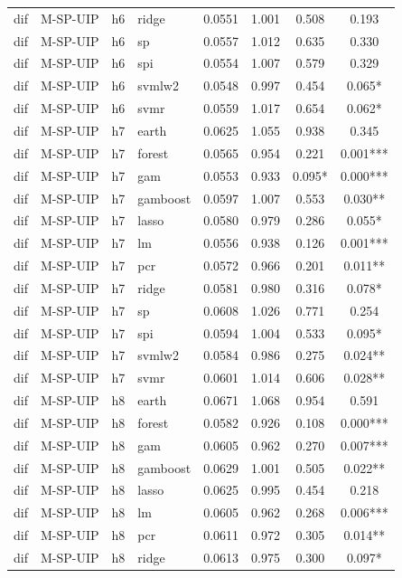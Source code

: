 \begin{ThreePartTable}
\begin{longtable}[t]{llclcccc}
dif & M-SP-UIP & h6 & ridge & 0.0551 & 1.001 & 0.508 & 0.193\\
dif & M-SP-UIP & h6 & sp & 0.0557 & 1.012 & 0.635 & 0.330\\
dif & M-SP-UIP & h6 & spi & 0.0554 & 1.007 & 0.579 & 0.329\\
dif & M-SP-UIP & h6 & svmlw2 & 0.0548 & 0.997 & 0.454 & 0.065*\\
dif & M-SP-UIP & h6 & svmr & 0.0559 & 1.017 & 0.654 & 0.062*\\
\addlinespace
dif & M-SP-UIP & h7 & earth & 0.0625 & 1.055 & 0.938 & 0.345\\
dif & M-SP-UIP & h7 & forest & 0.0565 & 0.954 & 0.221 & 0.001***\\
dif & M-SP-UIP & h7 & gam & 0.0553 & 0.933 & 0.095* & 0.000***\\
dif & M-SP-UIP & h7 & gamboost & 0.0597 & 1.007 & 0.553 & 0.030**\\
dif & M-SP-UIP & h7 & lasso & 0.0580 & 0.979 & 0.286 & 0.055*\\
dif & M-SP-UIP & h7 & lm & 0.0556 & 0.938 & 0.126 & 0.001***\\
dif & M-SP-UIP & h7 & pcr & 0.0572 & 0.966 & 0.201 & 0.011**\\
dif & M-SP-UIP & h7 & ridge & 0.0581 & 0.980 & 0.316 & 0.078*\\
dif & M-SP-UIP & h7 & sp & 0.0608 & 1.026 & 0.771 & 0.254\\
dif & M-SP-UIP & h7 & spi & 0.0594 & 1.004 & 0.533 & 0.095*\\
dif & M-SP-UIP & h7 & svmlw2 & 0.0584 & 0.986 & 0.275 & 0.024**\\
dif & M-SP-UIP & h7 & svmr & 0.0601 & 1.014 & 0.606 & 0.028**\\
\addlinespace
dif & M-SP-UIP & h8 & earth & 0.0671 & 1.068 & 0.954 & 0.591\\
dif & M-SP-UIP & h8 & forest & 0.0582 & 0.926 & 0.108 & 0.000***\\
dif & M-SP-UIP & h8 & gam & 0.0605 & 0.962 & 0.270 & 0.007***\\
dif & M-SP-UIP & h8 & gamboost & 0.0629 & 1.001 & 0.505 & 0.022**\\
dif & M-SP-UIP & h8 & lasso & 0.0625 & 0.995 & 0.454 & 0.218\\
dif & M-SP-UIP & h8 & lm & 0.0605 & 0.962 & 0.268 & 0.006***\\
dif & M-SP-UIP & h8 & pcr & 0.0611 & 0.972 & 0.305 & 0.014**\\
dif & M-SP-UIP & h8 & ridge & 0.0613 & 0.975 & 0.300 & 0.097*\\

\end{longtable}
\end{ThreePartTable}
